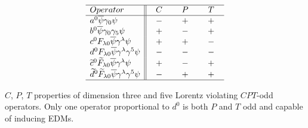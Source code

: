\documentclass[prl,twocolumn,tightenlines,preprintnumbers,floatfix,nofootinbib]{revtex4}
\begin{document}
\begin{table}[tb]
\label{CPT_table}
\begin{equation*}
\begin{array}{l||ccc}
\hline
  Operator   &  C  &  P  &  T    \\
     
\hline
a^0 \overline{\psi}\gamma_0 \psi & - & + & +\\

b^0 \overline{\psi}\gamma_0 \gamma_5\psi & + & -& +\\

c^0 F_{\lambda 0} \overline{\psi} \gamma^\lambda  \psi &
	~~+~~  &  ~~+~~  &  ~~-~~    \\

d^0 F_{\lambda 0}  \overline{\psi} \gamma^\lambda \gamma^5 \psi &
	-  &  -  &  -    \\

\widetilde{c}^0 \widetilde{F}_{\lambda 0} \overline{\psi} \gamma^\lambda 
	 \psi &
	+  &  -  &  +    \\

\widetilde{d}^0 \widetilde{F}_{\lambda 0} \overline{\psi} \gamma^\lambda 
	 \gamma^5 \psi &
	-  &  +  &  +    \\
\hline
\end{array}	
\end{equation*}
\caption{$C$, $P$, $T$ properties of dimension three and five Lorentz violating $CPT$-odd
 operators. Only one operator
proportional to $d^0$ is both $P$ and $T$ odd and capable of inducing EDMs. }
\end{table}
\end{document}
